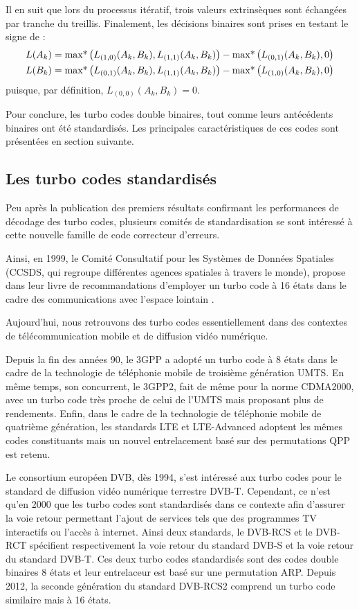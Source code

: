 Il en suit que lors du processus itératif, trois valeurs extrinsèques sont échangées par tranche du treillis.
Finalement, les décisions binaires sont prises en testant le signe de : 
\begin{align*}
	L(A_k) & = \operatorname*{max*} \left(L_{(1,0)}(A_k,B_k),L_{(1,1)}(A_k,B_k)\right) - \operatorname*{max*} \left(L_{(0,1)}(A_k,B_k),0\right) \\
	L(B_k) & = \operatorname*{max*} \left(L_{(0,1)}(A_k,B_k),L_{(1,1)}(A_k,B_k)\right) - \operatorname*{max*} \left(L_{(1,0)}(A_k,B_k),0\right) 
\end{align*}
puisque, par définition, $L_{(0,0)}(A_k,B_k)=0$.

Pour conclure, les turbo codes double binaires, tout comme leurs antécédents binaires ont été standardisés. Les principales caractéristiques de ces codes sont présentées en section suivante.

\subsection{Les turbo codes standardisés}
Peu après la publication des premiers résultats confirmant les performances de décodage des turbo codes, plusieurs comités de standardisation se sont intéressé à cette nouvelle famille de code correcteur d'erreurs.

Ainsi, en 1999, le Comité Consultatif pour les Systèmes de Données Spatiales (CCSDS, qui regroupe différentes agences spatiales à travers le monde), propose dans leur livre de recommandations d'employer un turbo code à 16 états dans le cadre des communications avec l'espace lointain \cite{ccsdsBluebook}. 

Aujourd'hui, nous retrouvons des turbo codes essentiellement dans des contextes de télécommunication mobile et de diffusion vidéo numérique.

Depuis la fin des années 90, le 3GPP a adopté un turbo code à 8 états dans le cadre de la technologie de téléphonie mobile de troisième génération UMTS. En même temps, son concurrent, le 3GPP2, fait de même pour la norme CDMA2000, avec un turbo code très proche de celui de l'UMTS mais proposant plus de rendements. 
Enfin, dans le cadre de la technologie de téléphonie mobile de quatrième génération, les standards LTE et LTE-Advanced \cite{lte} adoptent les mêmes codes constituants mais un nouvel entrelacement basé sur des permutations QPP est retenu.

Le consortium européen DVB, dès 1994, s'est intéressé aux turbo codes pour le standard de diffusion vidéo numérique terrestre DVB-T. Cependant, ce n'est qu'en 2000 que les turbo codes sont standardisés dans ce contexte afin d'assurer la voie retour permettant l'ajout de services tels que des programmes TV interactifs ou l’accès à internet. Ainsi deux standards, le DVB-RCS \cite{dvbrcs} et le DVB-RCT \cite{dvbrct} spécifient respectivement la voie retour du standard DVB-S et la voie retour du standard DVB-T. Ces deux turbo codes standardisés sont des codes double binaires 8 états et leur entrelaceur est basé sur une permutation ARP. Depuis 2012, la seconde génération du standard DVB-RCS2 \cite{dvbrcs2} comprend un turbo code similaire mais à 16 états.

